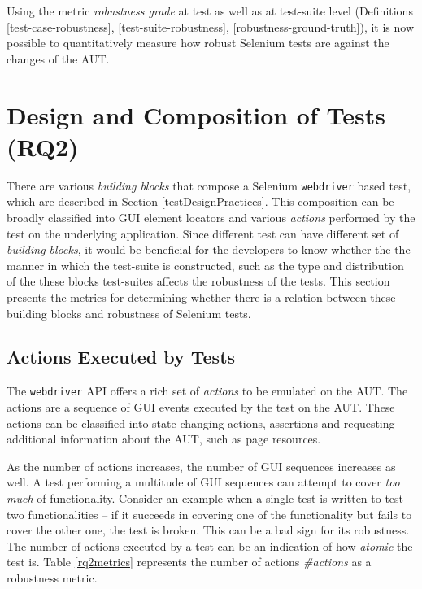 Using the metric \textit{robustness grade} at test as well as at test-suite level (Definitions \ref{test-case-robustness}, \ref{test-suite-robustness}, \ref{robustness-ground-truth}), it is now possible to quantitatively measure how robust Selenium tests are against the changes of the AUT. 

\section{Design and Composition of Tests (RQ2)}
\label{robfactors}
There are various \textit{building blocks} that compose a Selenium \texttt{webdriver} based test, which are described in Section \ref{testDesignPractices}. This composition can be broadly classified into GUI element locators and various \textit{actions} performed by the test on the underlying application. Since different test can have different set of \textit{building blocks}, it would be beneficial for the developers to know whether the the manner in which the test-suite is constructed, such as the type and distribution of the these blocks test-suites affects the robustness of the tests. This section presents the metrics for determining whether there is a relation between these building blocks and robustness of Selenium tests.  

\subsection{Actions Executed by Tests}
\label{test-actions}
The \texttt{webdriver} API offers a rich set of \textit{actions} to be emulated on the AUT. The actions are a sequence of GUI events executed by the test on the AUT. These actions can be classified into state-changing actions, assertions and requesting additional information about the AUT, such as page resources. 

As the number of actions increases, the number of GUI sequences increases as well. A test performing a multitude of GUI sequences can attempt to cover \textit{too much} of functionality. Consider an example when a single test is written to test two functionalities -- if it succeeds in covering one of the functionality but fails to cover the other one, the test is broken. This can be a bad sign for its robustness. 
The number of actions executed by a test can be an indication of how \textit{atomic} the test is. Table \ref{rq2metrics} represents the number of actions \textit{\#actions} as a robustness metric. 

